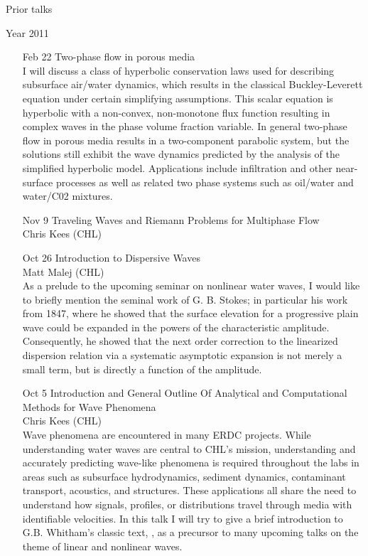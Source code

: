 \documentclass[12]{article}
\begin{document}
\begin{center}
\Large
Prior talks
\end{center}

\begin{center}
\Large
Year 2011
\end{center}

\begin{enumerate}

\item[Feb 22] Two-phase flow in porous media\\
I will discuss a class of hyperbolic conservation laws used
for describing subsurface air/water dynamics, which results in the
classical Buckley-Leverett equation under certain simplifying
assumptions. This scalar equation is hyperbolic with a non-convex,
non-monotone flux function resulting in complex waves in the phase
volume fraction variable. In general two-phase flow in porous media
results in a two-component parabolic system, but the solutions still
exhibit the wave dynamics predicted by the analysis of the simplified
hyperbolic model.  Applications include infiltration and other near-surface
processes as well as related two phase systems such as oil/water and
water/C02 mixtures.

\item[Nov 9] Traveling Waves and Riemann Problems for Multiphase Flow\\
Chris Kees (CHL)\\

\item[Oct 26] Introduction to Dispersive Waves\\ Matt Malej
  (CHL)\\As a prelude to the upcoming seminar on nonlinear
  water waves, I would like to briefly mention the seminal work of
  G. B. Stokes; in particular his work from 1847, where he showed that
  the surface elevation for a progressive plain wave could be expanded
  in the powers of the characteristic amplitude. Consequently, he
  showed that the next order correction to the linearized dispersion
  relation via a systematic asymptotic expansion is not merely a small
  term, but is directly a function of the amplitude.
\item[Oct 5] Introduction and General Outline Of Analytical and
  Computational Methods for Wave Phenomena\\ Chris Kees (CHL)\\ Wave
  phenomena are encountered in many ERDC projects. While understanding
  water waves are central to CHL's mission, understanding and
  accurately predicting wave-like phenomena is required throughout the
  labs in areas such as subsurface hydrodynamics, sediment dynamics,
  contaminant transport, acoustics, and structures.  These
  applications all share the need to understand how signals, profiles,
  or distributions travel through media with identifiable
  velocities. In this talk I will try to give a brief introduction to
  G.B. Whitham's classic text, ,
  as a precursor to many upcoming talks on the theme of linear and
  nonlinear waves.


\end{enumerate}
\end{document}
